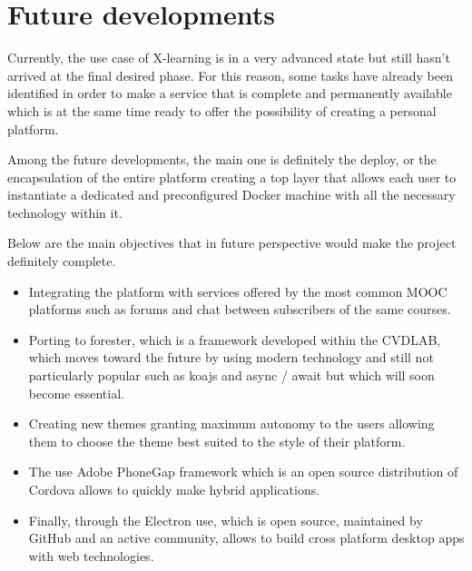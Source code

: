 \section{Future developments}
\label{sec:future_developments}

Currently, the use case of X-learning is in a very advanced state but still hasn't arrived at the final desired phase.
For this reason, some tasks have already been identified in order to make a service that is complete and permanently available which is at the same time ready to offer the possibility of creating a personal platform.

Among the future developments, the main one is definitely the deploy, or the encapsulation of the entire platform creating a top layer that allows each user to instantiate a dedicated and preconfigured Docker machine with all the necessary technology within it.

Below are the main objectives that in future perspective would make the project definitely complete.



\begin{itemize}
  \item Integrating the platform with services offered by the most common MOOC platforms such as forums and chat between subscribers of the same courses.

  \item Porting to forester, which is a framework developed within the CVDLAB, which moves toward the future by using modern technology and still not particularly popular such as koajs and async / await but which will soon become essential.

  \item Creating new themes granting maximum autonomy to the users allowing them to choose the theme best suited to the style of their platform.

  \item The use Adobe PhoneGap framework which is an open source distribution of Cordova allows to quickly make hybrid applications.

  \item Finally, through the Electron use, which is open source, maintained by GitHub and an active community, allows to build cross platform desktop apps with web technologies.\cite{electron}

\end{itemize}